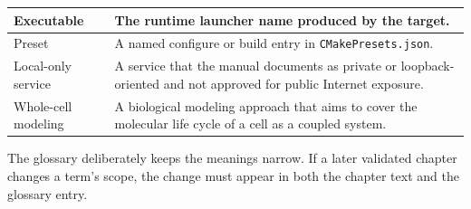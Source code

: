 \begin{table}[htbp]
\begin{tabular}{|p{3.6cm}|p{8.0cm}|}
Executable\index{executable} & The runtime launcher name produced by the target. \\
\hline
Preset\index{preset} & A named configure or build entry in \texttt{CMakePresets.json}. \\
\hline
Local-only service\index{local-only service} & A service that the manual documents as private or loopback-oriented and not approved for public Internet exposure. \\
\hline
Whole-cell modeling\index{whole-cell modeling} & A biological modeling approach that aims to cover the molecular life cycle of a cell as a coupled system. \\
\hline
\end{tabular}
\end{table}

The glossary deliberately keeps the meanings narrow. If a later validated
chapter changes a term's scope, the change must appear in both the chapter text
and the glossary entry.
